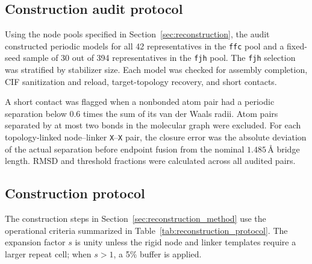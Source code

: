 \documentclass[a5paper, 10pt]{article}
\begin{document}
\subsection{Construction audit protocol}
\label{app:reconstruction_audit}

Using the node pools specified in Section~\ref{sec:reconstruction}, the audit constructed periodic models for all 42 representatives in the \texttt{ffc} pool and a fixed-seed sample of 30 out of 394 representatives in the \texttt{fjh} pool. The \texttt{fjh} selection was stratified by stabilizer size. Each model was checked for assembly completion, CIF sanitization and reload, target-topology recovery, and short contacts.

A short contact was flagged when a nonbonded atom pair had a periodic separation below $0.6$ times the sum of its van der Waals radii. Atom pairs separated by at most two bonds in the molecular graph were excluded. For each topology-linked node--linker \texttt{X}--\texttt{X} pair, the closure error was the absolute deviation of the actual separation before endpoint fusion from the nominal $1.485$\,\AA{} bridge length. RMSD and threshold fractions were calculated across all audited pairs.

\subsection{Construction protocol}
\label{app:reconstruction_protocol}

The construction steps in Section~\ref{sec:reconstruction_method} use the operational criteria summarized in Table~\ref{tab:reconstruction_protocol}. The expansion factor $s$ is unity unless the rigid node and linker templates require a larger repeat cell; when $s>1$, a 5\% buffer is applied.
\end{document}
